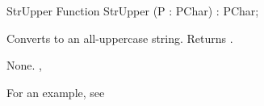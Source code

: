 \html{}
\begin{function}{StrUpper}
\Declaration
Function StrUpper (P : PChar) : PChar;

\Description

Converts  to an all-uppercase string. Returns .

\Errors
None.
\SeeAlso
{}, 
\end{function}
For an example, see 
